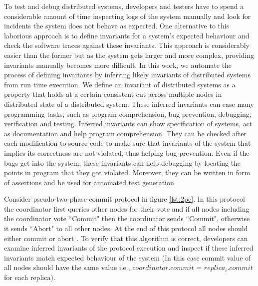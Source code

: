 To test and debug distributed systems, developers and testers have to spend a considerable amount of time inspecting logs of the system manually and look for incidents the system does not behave as 
expected. One alternative to this laborious approach is to define invariants for a system's expected behaviour and check the software traces against these invariants. This approach is considerably easier than the former but as the system gets larger and more 
complex, providing invariants manually becomes more difficult. In this work, we automate the process of defining invariants by inferring likely invariants of distributed systems from run time execution. We define an invariant of distributed systems as a property that holds at a certain consistent cut across multiple nodes in distributed state of a distributed system. These inferred invariants can ease many programming tasks, such as program comprehension, bug prevention, debugging, verification and testing. Inferred invariants can show specification of systems,  act as documentation and help program comprehension. They can be checked after each modification to source code to make sure that invariants of the system that implies its correctness are not violated, thus helping bug prevention. Even if the bugs get into the system, these invariants can help debugging by locating the points in program that they got violated. Moreover, they can be written in form of assertions and be used for automated test generation. 





Consider pseudo-two-phase-commit protocol in figure \ref{lst:2pc}. In this protocol the coordinator first queries other nodes for their vote and if all nodes including the coordinator vote ``Commit" then the coordinator sends ``Commit", otherwise it sends ``Abort" to all other nodes. At the end of this protocol all nodes should either commit or abort . To verify that this algorithm is correct, developers can examine inferred invariants of the protocol execution and inspect if these inferred invariants match expected behaviour of the system (In this case commit value of all nodes should have the same value i.e., $coordinator.commit$ = $replica_i .commit$ for each replica).


